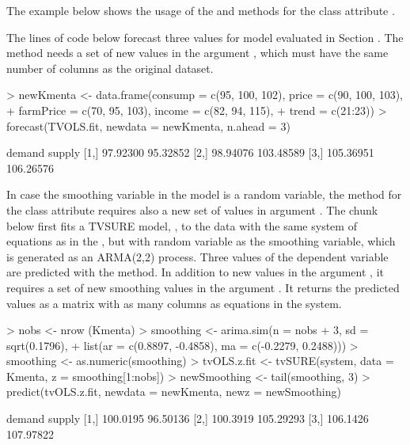 The example below shows the usage of the  and  methods for the class attribute .

The lines of code below forecast three values for model  evaluated in Section . The method needs a set of new values in the argument , which must have the same number of columns as the original dataset. 

\begin{Schunk}
\begin{Sinput}
> newKmenta <- data.frame(consump = c(95, 100, 102), price = c(90, 100, 103),
+                         farmPrice = c(70, 95, 103), income = c(82, 94, 115), 
+                         trend = c(21:23))
> forecast(TVOLS.fit, newdata = newKmenta, n.ahead = 3)
\end{Sinput}
\begin{Soutput}
        demand    supply
[1,]  97.92300  95.32852
[2,]  98.94076 103.48589
[3,] 105.36951 106.26576
\end{Soutput}
\end{Schunk}

In case the smoothing variable in the model is a random variable, the  method for the class attribute  requires also a new set of values in argument . The chunk below first fits a TVSURE model, , to the  data with the same system of equations as in the , but with random variable as the smoothing variable, which is generated as an ARMA(2,2) process. Three values of the dependent variable are predicted with the  method. In addition to new values in the argument , it requires a set of new smoothing values  in the argument . It returns the predicted values as a matrix with as many columns as equations in the system. 

\begin{Schunk}
\begin{Sinput}
> nobs <- nrow (Kmenta)
> smoothing <- arima.sim(n = nobs + 3, sd = sqrt(0.1796),
+                        list(ar = c(0.8897, -0.4858), ma = c(-0.2279, 0.2488))) 
> smoothing <- as.numeric(smoothing)
> tvOLS.z.fit <- tvSURE(system, data = Kmenta, z = smoothing[1:nobs])
> newSmoothing <- tail(smoothing, 3)
> predict(tvOLS.z.fit, newdata = newKmenta, newz = newSmoothing)
\end{Sinput}
\begin{Soutput}
       demand    supply
[1,] 100.0195  96.50136
[2,] 100.3919 105.29293
[3,] 106.1426 107.97822
\end{Soutput}
\end{Schunk}


